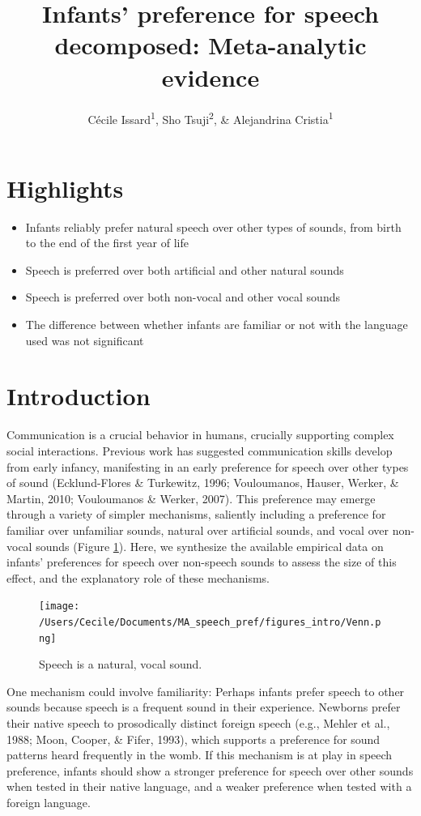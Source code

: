 \documentclass[man]{apa6}
\title{Infants' preference for speech decomposed: Meta-analytic evidence}
\author{Cécile Issard\textsuperscript{1}, Sho Tsuji\textsuperscript{2}, \& Alejandrina Cristia\textsuperscript{1}}
\date{}
\affiliation{
\vspace{0.5cm}
\textsuperscript{1} Laboratoire de Sciences Cognitives et Psycholinguistique, Ecole Normale Supérieure, Département d'Études Cognitives\\\textsuperscript{2} International Research Center for Neurointelligence, The University of Tokyo}
\providecommand{\tightlist}{%
  \setlength{\itemsep}{0pt}\setlength{\parskip}{0pt}}
\begin{document}
\maketitle

\hypertarget{highlights}{%
\section{Highlights}\label{highlights}}

\begin{itemize}
\tightlist
\item
  Infants reliably prefer natural speech over other types of sounds, from birth to the end of the first year of life
\item
  Speech is preferred over both artificial and other natural sounds
\item
  Speech is preferred over both non-vocal and other vocal sounds
\item
  The difference between whether infants are familiar or not with the language used was not significant
\end{itemize}

\hypertarget{introduction}{%
\section{Introduction}\label{introduction}}

Communication is a crucial behavior in humans, crucially supporting complex social interactions. Previous work has suggested communication skills develop from early infancy, manifesting in an early preference for speech over other types of sound (Ecklund-Flores \& Turkewitz, 1996; Vouloumanos, Hauser, Werker, \& Martin, 2010; Vouloumanos \& Werker, 2007). This preference may emerge through a variety of simpler mechanisms, saliently including a preference for familiar over unfamiliar sounds, natural over artificial sounds, and vocal over non-vocal sounds (Figure \ref{fig:venn}). Here, we synthesize the available empirical data on infants' preferences for speech over non-speech sounds to assess the size of this effect, and the explanatory role of these mechanisms.

\begin{figure}
\centering
\texttt{[image: /Users/Cecile/Documents/MA\_speech\_pref/figures\_intro/Venn.png]}
\caption{\label{fig:venn}Speech is a natural, vocal sound.}
\end{figure}

One mechanism could involve familiarity: Perhaps infants prefer speech to other sounds because speech is a frequent sound in their experience. Newborns prefer their native speech to prosodically distinct foreign speech (e.g., Mehler et al., 1988; Moon, Cooper, \& Fifer, 1993), which supports a preference for sound patterns heard frequently in the womb. If this mechanism is at play in speech preference, infants should show a stronger preference for speech over other sounds when tested in their native language, and a weaker preference when tested with a foreign language.
\end{document}
